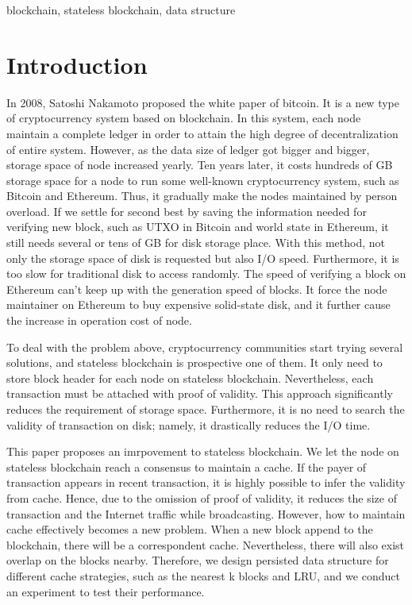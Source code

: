 \documentclass[conference]{IEEEtran}
\begin{document}
\begin{IEEEkeywords}
blockchain, stateless blockchain, data structure
\end{IEEEkeywords}

\section{Introduction}
In 2008, Satoshi Nakamoto proposed the white paper of bitcoin. It is a new type of cryptocurrency system based on blockchain. In this system, each node maintain a complete ledger in order to attain the high degree of decentralization of entire system. However, as the data size of ledger got bigger and bigger, storage space of node increased yearly. Ten years later, it costs hundreds of GB storage space for a node to run some well-known cryptocurrency system, such as Bitcoin and Ethereum. Thus, it gradually make the nodes maintained by person overload. If we settle for second best by saving the information needed for verifying new block, such as UTXO in Bitcoin and world state in Ethereum, it still needs several or tens of GB for disk storage place. With this method, not only the storage space of disk is requested but also  I/O speed. Furthermore, it is too slow for traditional disk to access randomly. The speed of verifying a block on Ethereum can't keep up with the generation speed of blocks. It force the node maintainer on Ethereum to buy expensive solid-state disk, and it further cause the increase in operation cost of node.

To deal with the problem above, cryptocurrency communities start trying several solutions, and stateless blockchain is prospective one of them. It only need to store block header for each node on stateless blockchain. Nevertheless, each transaction must be attached with proof of validity. This approach significantly reduces the requirement of storage space. Furthermore, it is no need to search the validity of transaction on disk; namely, it drastically reduces the I/O time.

This paper proposes an imrpovement to stateless blockchain. We let the node on stateless blockchain reach a consensus to maintain a cache. If the payer of transaction appears in recent transaction, it is highly possible to infer the validity from cache. Hence, due to the omission of proof of validity, it reduces the size of transaction and the Internet traffic while broadcasting. However, how to maintain cache effectively becomes a new problem. When a new block append to the blockchain, there will be a correspondent cache. Nevertheless, there will also exist overlap on the blocks nearby. Therefore, we design persisted data structure for different cache strategies, such as the nearest k blocks and LRU, and we conduct an experiment to test their performance.
\end{document}

